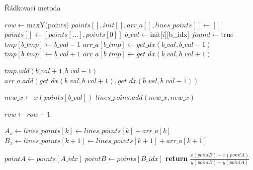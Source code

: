\documentclass[a4paper,12pt]{book}
\begin{document}
\begin{algorithm}
\caption{Řádkovací metoda}
\begin{algorithmic}


\State $row \gets \text{maxY(points)}$
\State $points[], init[],arr\_a[],lines\_points[] \gets []$
\State $points[] \gets [points[...],points[0]]$
   \State $b\_val \gets $init[$i][$b\_idx]
	 \State $found \gets \text{true}$
	  	\State $tmp[b\_tmp] \gets b\_val-1$
	  	\State $arr\_a[b\_tmp] \gets get\_dx(b\_val,b\_val-1)$
	  	\State $tmp[b\_tmp] \gets b\_val+1$
	  	\State $arr\_a[b\_tmp] \gets get\_dx(b\_val,b\_val+1)$
		\State {}
	\Else
		\State {}
		\State {}
	  \EndIf
		 \State {}
	\EndIf
\EndFor
{}
		\\
	
	  	
	  	\State $tmp.add(b\_val+1,b\_val-1)$
	  	\State $arr\_a.add(get\_dx(b\_val,b\_val+1),get\_dx(b\_val,b\_val-1))$
	  	
	  	\State $new\_x \gets x(points[b\_val])$
	  	\State $lines\_poins.add(new\_x, new\_x)$
\EndIf
\EndFor


	\State $row \gets row-1$

	\State $A_x \gets lines\_points[k] \gets lines\_points[k] + arr\_a[k]$
	\State $B_x \gets lines\_points[k+1] \gets lines\_points[k+1] + arr\_a[k+1]$
	\\
	\EndFor	
\EndFor


\EndFor


\EndFor
\EndFunction

    \State $pointA \gets points[A\_idx]$
    \State $pointB \gets points[B\_idx]$
    \State \textbf{return} $\frac{x(pointB)-x(pointA)}{y(pointB)-y(pointA)}$
\EndFunction


\end{algorithmic}
\end{algorithm}
\end{document}
